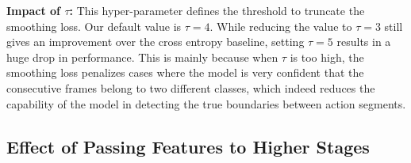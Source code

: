 \documentclass[10pt,twocolumn,letterpaper]{article}
\begin{document}
\noindent\textbf{Impact of $\tau$:} This hyper-parameter defines the threshold to truncate 
the smoothing loss. Our default value is $\tau=4$. While reducing the value to $\tau=3$ 
still gives an improvement over the cross entropy baseline, setting $\tau=5$ results 
in a huge drop in performance. This is mainly because when $\tau$ is too high, the smoothing 
loss penalizes cases where the model is very confident that the consecutive frames 
belong to two different classes, which indeed reduces the capability of the model in 
detecting the true boundaries between action segments.

\begin{table}[tb]
\centering
{}
\caption{Impact of $\lambda$ and $\tau$ on the 50Salads dataset.}
\label{tab:impact_lambda_tau}
\end{table}


\subsection{Effect of Passing Features to Higher Stages}

\begin{table}[tb]
\centering
{}
\caption{Effect of passing features to higher stages on the 50Salads dataset.}
\label{tab:features}
\end{table}
\end{document}
